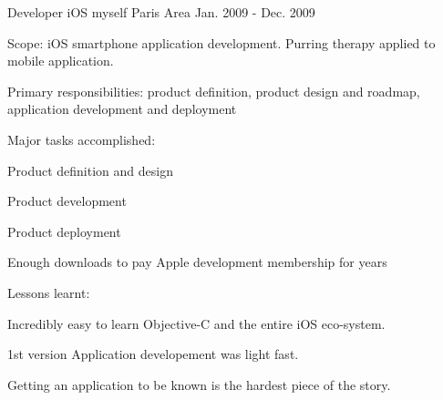 \begin{cventries}
  \cventry
    {Developer iOS} %
    {myself} %
    {Paris Area} %
    {Jan. 2009 - Dec. 2009} %
    {
      \begin{cvitems} %
        \item {Scope: iOS smartphone application development. Purring therapy applied to mobile application.}
        \item {Primary responsibilities: product definition, product design and roadmap, application development and deployment}
        \item {Major tasks accomplished:}
        \begin{cvsubitems}
          \item {Product definition and design}
          \item {Product development}
          \item {Product deployment}
          \item {Enough downloads to pay Apple development membership for years}
        \end{cvsubitems}
        \item {Lessons learnt:}
        \begin{cvsubitems}
          \item {Incredibly easy to learn Objective-C and the entire iOS eco-system.}
          \item {1st version Application developement was light fast.}
          \item {Getting an application to be known is the hardest piece of the story.}
        \end{cvsubitems}
      \end{cvitems}
    }


\end{cventries}
